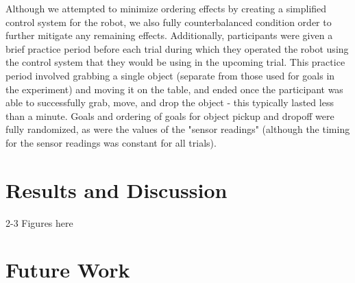\documentclass[conference]{IEEEtran}
\begin{document}
Although we attempted to minimize ordering effects by creating a simplified control system for the robot, we also fully counterbalanced condition order to further mitigate any remaining effects. Additionally, participants were given a brief practice period before each trial during which they operated the robot using the control system that they would be using in the upcoming trial. This practice period involved grabbing a single object (separate from those used for goals in the experiment) and moving it on the table, and ended once the participant was able to successfully grab, move, and drop the object - this typically lasted less than a minute. Goals and ordering of goals for object pickup and dropoff were fully randomized, as were the values of the "sensor readings" (although the timing for the sensor readings was constant for all trials).
\section{Results and Discussion}
2-3 Figures here

\section{Future Work}



\end{document}
